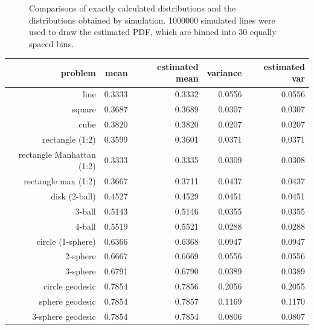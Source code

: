 \begin{figure}[tbp]
\begin{center}
    \caption{\label{fig:sim_vs_exact2}Comparisons of exactly calculated
      distributions and the distributions obtained by simulation. 
      1000000 simulated lines were used to draw the estimated PDF,
      which are binned into 30 equally spaced bins.}
  \end{center} 
\vspace{-4mm}
\end{figure}



\begin{table}[ht]
  \centering
  \begin{tabular}{r|rrrr}
                  problem &     mean & estimated mean & variance &  estimated var \\
     \hline 
                     line &   0.3333 &         0.3332 &   0.0556 &         0.0556 \\
                   square &   0.3687 &         0.3689 &   0.0307 &         0.0307 \\
                     cube &   0.3820 &         0.3820 &   0.0207 &         0.0207 \\
          rectangle (1:2) &   0.3599 &         0.3601 &   0.0371 &         0.0371 \\
rectangle Manhattan (1:2) &   0.3333 &         0.3335 &   0.0309 &         0.0308 \\
      rectangle max (1:2) &   0.3667 &         0.3711 &   0.0437 &         0.0437 \\
            disk (2-ball) &   0.4527 &         0.4529 &   0.0451 &         0.0451 \\
                   3-ball &   0.5143 &         0.5146 &   0.0355 &         0.0355 \\
                   4-ball &   0.5519 &         0.5521 &   0.0288 &         0.0288 \\
        circle (1-sphere) &   0.6366 &         0.6368 &   0.0947 &         0.0947 \\
                 2-sphere &   0.6667 &         0.6669 &   0.0556 &         0.0556 \\
                 3-sphere &   0.6791 &         0.6790 &   0.0389 &         0.0389 \\
          circle geodesic &   0.7854 &         0.7856 &   0.2056 &         0.2055 \\
          sphere geodesic &   0.7854 &         0.7857 &   0.1169 &         0.1170 \\
        3-sphere geodesic &   0.7854 &         0.7854 &   0.0806 &         0.0807 \\

\end{tabular}
\end{table}
